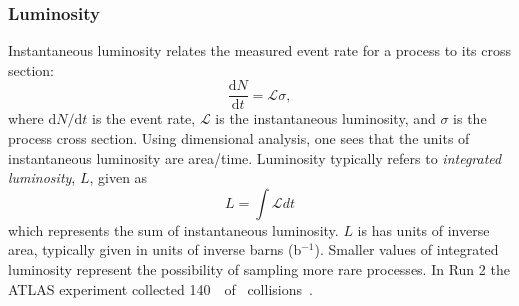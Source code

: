 \subsubsection{Luminosity}
\label{sec:lumi}
Instantaneous luminosity relates the measured event rate for a process to its cross section:
\begin{equation}
    \label{eq:luminosity_event_rate}
    \frac{\mathrm{d}N}{\mathrm{d}t} = \mathcal{L}\sigma,
\end{equation}
where $\mathrm{d}N/\mathrm{d}t$ is the event rate, $\mathcal{L}$ is the instantaneous luminosity, and $\sigma$ is the process cross section.
Using dimensional analysis, one sees that the units of instantaneous luminosity are area/time.
Luminosity typically refers to \textit{integrated luminosity}, $L$,  given as
\begin{equation}
    \label{eq:int_luminosity}
    L = \int \mathcal{L} dt
\end{equation}
which represents the sum of instantaneous luminosity.
$L$ is has units of inverse area, typically given in units of inverse barns (b$^{-1}$).
Smaller values of integrated luminosity represent the possibility of sampling more rare processes.
In Run 2 the ATLAS experiment collected 140~\FB\ of \pxp\ collisions~\cite{DAPR-2021-01}.

